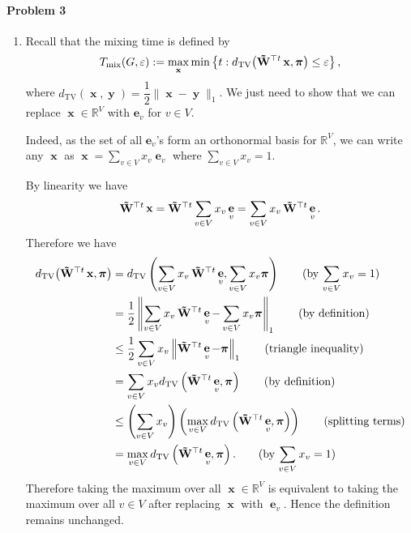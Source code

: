 \documentclass[12pt]{article}
\DeclareMathOperator{\TV}{TV}
\DeclareMathOperator{\mix}{mix}
\DeclareMathOperator{\x}{\mathbf{x}}
\DeclareMathOperator{\y}{\mathbf{y}}
\DeclareMathOperator{\e}{\mathbf{e}}
\DeclareMathOperator{\Wt}{\mathbf{\tilde{W}}^{\top\mathnormal{t}}}
\begin{document}
\paragraph{Problem 3}
\begin{enumerate}[label=\alph*., font=\bfseries]
\item Recall that the mixing time is defined by
$$T_{\mix}(G,\varepsilon):=\max_{\mathbf{x}}\min\left\{t:d_{\TV}\!\left(\Wt\mathbf{x},\bm{\pi}\right)\le\varepsilon\right\},$$
where $d_{\TV}(\x,\y)=\dfrac{1}{2}\lVert\x-\y\rVert_1$.
We just need to show that we can replace $\x\in\mathbb{R}^V$ with $\mathbf{e}_v$ for $v\in V$.

Indeed, as the set of all $\mathbf{e}_v$'s form an orthonormal basis for $\mathbb{R}^V$, we can write any $\x$ as $\x=\sum_{v\in V}x_v\e_v$ where $\sum_{v\in V}x_v=1$.

By linearity we have \[\Wt\x=\Wt\sum_{v\in V}x_v\e_v=\sum_{v\in V}x_v\Wt\e_v.\]Therefore we have \begin{align*}
d_{\TV}\!\left(\Wt\mathbf{x},\bm{\pi}\right)&=d_{\TV}\left(\sum_{v\in V}x_v\Wt\e_v,\sum_{v\in V}x_v\bm{\pi}\right)\tag*{(by \(\displaystyle\sum_{v\in V}x_v=1)\)}\\
&=\dfrac{1}{2}\left\lVert\sum_{v\in V}x_v\Wt\e_v-\sum_{v\in V}x_v\bm{\pi}\right\rVert_1\tag*{(by definition)}\\
&\le\dfrac{1}{2}\sum_{v\in V}x_v\left\lVert\Wt\e_v-\bm{\pi}\right\rVert_1\tag*{(triangle inequality)}\\
&=\sum_{v\in V}x_v d_{\TV}\left(\Wt\e_v,\bm{\pi}\right)\tag*{(by definition)}\\
&\le\left(\sum_{v\in V}x_v\right)\left(\max_{v\in V}d_{\TV}\left(\Wt\e_v,\bm{\pi}\right)\right)\tag*{(splitting terms)}\\
&=\max_{v\in V}d_{\TV}\left(\Wt\e_v,\bm{\pi}\right).\tag*{(by \(\displaystyle\sum_{v\in V}x_v=1)\)}
\end{align*}
Therefore taking the maximum over all $\x\in\mathbb{R}^V$ is equivalent to taking the maximum over all $v\in V$ after replacing $\x$ with $\e_v$. Hence the definition remains unchanged.
\end{enumerate}
\end{document}
